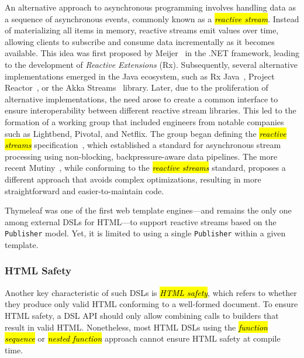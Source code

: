 \documentclass[software,article,accept,pdftex,moreauthors]{Definitions/mdpi}
\begin{document}
An alternative approach to asynchronous programming involves handling data as
a sequence of asynchronous events, commonly known as a \textit{\hl{reactive stream}}.
Instead of materializing all items in memory, reactive streams emit values over
time, allowing clients to subscribe and consume data incrementally as it becomes
available.
This idea was first proposed by Meijer~\cite{rx-observable} in the .NET
framework, leading to the development of \textit{Reactive Extensions} (Rx).
Subsequently, several alternative implementations emerged in the Java ecosystem,
such as Rx Java~\cite{rxjava}, Project Reactor~\cite{projectreactor}, or the
Akka Streams~\cite{akka} library.
Later, due to the proliferation of alternative implementations, the need arose to
create a common interface to ensure interoperability between different reactive
stream libraries. This led to the formation of a working group that included
engineers from notable companies such as Lightbend, Pivotal, and Netflix.
The group began defining the \textit{\hl{reactive streams}}
specification~\cite{ReactiveStreams}, which established a standard for
asynchronous stream processing using non-blocking, backpressure-aware data
pipelines.
The more recent Mutiny~\cite{mutiny2021}, while conforming to the
\textit{\hl{reactive streams}} standard, proposes a different approach that avoids
complex optimizations, resulting in more straightforward and easier-to-maintain
code.

Thymeleaf was one of the first web template engines---and remains the only one
among external DSLs for HTML---to support reactive streams based on the
\texttt{Publisher} model. Yet, it is limited to using a single
\texttt{Publisher} within a given template.


\subsubsection{HTML Safety}\label{s2.1.4}

Another key characteristic of such DSLs is \textit{\hl{HTML safety}}, which refers
to whether they produce only valid HTML conforming to a well-formed document.
To ensure HTML safety, a DSL API should only allow combining calls to builders
that result in valid HTML. Nonetheless, most HTML DSLs using the \textit{\hl{function
  sequence}} or \textit{\hl{nested function}} approach cannot ensure HTML safety at
compile time.
\end{document}
